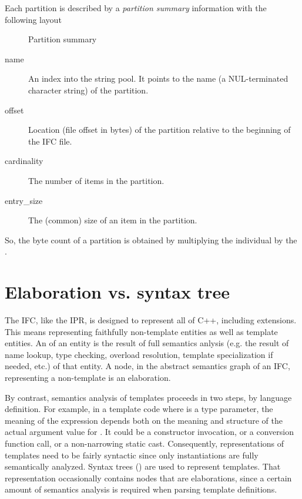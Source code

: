 Each partition is described by a \emph{partition summary} information with the
following layout
\begin{figure}[H]
  \centering
  \caption{Partition summary}
  \label{fig:ifc-partition-summary}
\end{figure}

\begin{description}
\item[name] An index into the string pool.  It points to the name (a
  NUL-terminated character string) of the partition.

\item[offset] Location (file offset in bytes) of the partition relative to the
  beginning of the IFC file.

\item[cardinality] The number of items in the partition.

\item[entry\_size] The (common) size of an item in the partition.
\end{description}

So, the byte count of a partition is obtained by multiplying the individual
 by the .

\section{Elaboration vs. syntax tree}
\label{sec:ifc-elaboration-vs-syntax-tree}

The IFC, like the IPR, is designed to represent all of C++, including extensions.  This means representing faithfully
non-template entities as well as template entities.  An  of an entity is the result of full semantics
anlysis (e.g. the result of name lookup, type checking, overload resolution, template specialization if needed, etc.) of that
entity.  A node, in the abstract semantics graph of an IFC, representing a non-template is an elaboration.

By contrast, semantics analysis of templates proceeds in two steps, by language definition.  For example, in a template code where  is a type parameter, the meaning of the expression  depends both on the meaning and structure of the 
actual argument value for .  It could be a constructor invocation, or a conversion function call, or a non-narrowing
static cast.  Consequently, representations of templates need to be fairly syntactic since only instantiations are fully semantically
analyzed.  Syntax trees () are used to represent templates. 
That representation occasionally contains nodes that are
elaborations, since a certain amount of semantics analysis is required when parsing template definitions.

